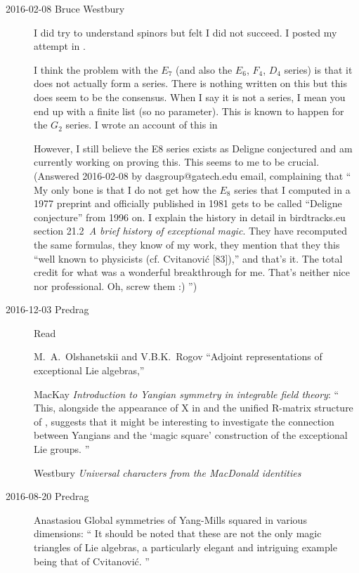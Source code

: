 \begin{description}
\item[2016-02-08 Bruce Westbury]
I did try to understand spinors but felt I did not succeed. I posted my
attempt in .

I think the problem with the $E_7$ (and also the $E_6$, $F_4$, $D_4$ series) is that
it does not actually form a series. There is nothing written on this but
this does seem to be the consensus. When I say it is not a series, I
mean you end up with a finite list (so no parameter). This is known to
happen for the $G_2$ series. I wrote an account of this in

However, I still believe the E8 series exists as Deligne conjectured and
am currently working on proving this. This seems to me to be crucial.
\\
(Answered 2016-02-08 by dasgroup@gatech.edu email,
complaining that ``
My only bone is that I do not get how the $E_8$ series that I computed in
a 1977 preprint and officially published in 1981 gets to be called
``Deligne conjecture'' from 1996 on. I explain the history in detail in
birdtracks.eu section 21.2~{\em A brief history of exceptional magic}. They
have recomputed the same formulas, they know of my work, they mention
that they this ``well known to physicists (cf. Cvitanovi{\'c} [83]),'' and
that's it. The total credit for what was a wonderful breakthrough for me.
That's neither nice nor professional. Oh, screw them :)
'')


\item[2016-12-03 Predrag]
Read

M.~A.~Olshanetskii and V.B.K.~Rogov
``Adjoint representations of exceptional Lie algebras,''

MacKay
{\em Introduction to {Yangian} symmetry in integrable field theory}:
``
This, alongside the appearance of X in  and the
unified R-matrix structure of , suggests that it might be
interesting to investigate the connection between Yangians and the `magic
square' construction of the exceptional Lie groups.
''

Westbury
{\em Universal characters from the {MacDonald} identities}


\item[2016-08-20 Predrag]
Anastasiou \etal{}
{Global symmetries of {Yang-Mills} squared in various dimensions}: ``
It should be noted that these are not the only magic triangles of Lie
algebras, a particularly elegant and intriguing example being that of
Cvitanovi{\'c}.
''


\end{description}

